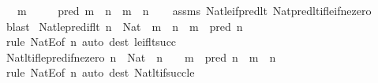 \begin{isabellebody}
\ \ \ {\isachardoublequoteopen}m\ {\isasymnoteq}\ {}{\isachardoublequoteclose}\isanewline
\ \ \ {\isachardoublequoteopen}pred\ m\ {\isacharless}{\kern0pt}\ n\ {\isasymlongleftrightarrow}\ m\ {\isasymle}\ n{\isachardoublequoteclose}\isanewline
%
\isadelimproof
\ \ %
\endisadelimproof
%
\isatagproof
{}\isamarkupfalse%
\ assms\ Nat{\isacharunderscore}{\kern0pt}le{\isacharunderscore}{\kern0pt}if{\isacharunderscore}{\kern0pt}pred{\isacharunderscore}{\kern0pt}lt\ Nat{\isacharunderscore}{\kern0pt}pred{\isacharunderscore}{\kern0pt}lt{\isacharunderscore}{\kern0pt}if{\isacharunderscore}{\kern0pt}le{\isacharunderscore}{\kern0pt}if{\isacharunderscore}{\kern0pt}ne{\isacharunderscore}{\kern0pt}zero\ \isamarkupfalse%
\ blast%
\endisatagproof
{\isafoldproof}%
%
\isadelimproof
\isanewline
%
\endisadelimproof
\isanewline
{}\isamarkupfalse%
\ Nat{\isacharunderscore}{\kern0pt}le{\isacharunderscore}{\kern0pt}pred{\isacharunderscore}{\kern0pt}if{\isacharunderscore}{\kern0pt}lt{\isacharcolon}{\kern0pt}\ {\isachardoublequoteopen}n\ {\isacharcolon}{\kern0pt}\ Nat\ {\isasymLongrightarrow}\ m\ {\isacharless}{\kern0pt}\ n\ {\isasymLongrightarrow}\ m\ {\isasymle}\ pred\ n{\isachardoublequoteclose}\isanewline
%
\isadelimproof
\ \ %
\endisadelimproof
%
\isatagproof
{}\isamarkupfalse%
\ {\isacharparenleft}{\kern0pt}rule\ NatE{\isacharbrackleft}{\kern0pt}of\ n{\isacharbrackright}{\kern0pt}{\isacharparenright}{\kern0pt}\ {\isacharparenleft}{\kern0pt}auto\ dest{\isacharcolon}{\kern0pt}\ le{\isacharunderscore}{\kern0pt}if{\isacharunderscore}{\kern0pt}lt{\isacharunderscore}{\kern0pt}succ{\isacharparenright}{\kern0pt}%
\endisatagproof
{\isafoldproof}%
%
\isadelimproof
\isanewline
%
\endisadelimproof
\isanewline
{}\isamarkupfalse%
\ Nat{\isacharunderscore}{\kern0pt}lt{\isacharunderscore}{\kern0pt}if{\isacharunderscore}{\kern0pt}le{\isacharunderscore}{\kern0pt}pred{\isacharunderscore}{\kern0pt}if{\isacharunderscore}{\kern0pt}ne{\isacharunderscore}{\kern0pt}zero{\isacharcolon}{\kern0pt}\ {\isachardoublequoteopen}n\ {\isacharcolon}{\kern0pt}\ Nat\ {\isasymLongrightarrow}\ n\ {\isasymnoteq}\ {}\ {\isasymLongrightarrow}\ m\ {\isasymle}\ pred\ n\ {\isasymLongrightarrow}\ m\ {\isacharless}{\kern0pt}\ n{\isachardoublequoteclose}\isanewline
%
\isadelimproof
\ \ %
\endisadelimproof
%
\isatagproof
{}\isamarkupfalse%
\ {\isacharparenleft}{\kern0pt}rule\ NatE{\isacharbrackleft}{\kern0pt}of\ n{\isacharbrackright}{\kern0pt}{\isacharparenright}{\kern0pt}\ {\isacharparenleft}{\kern0pt}auto\ dest{\isacharcolon}{\kern0pt}\ Nat{\isacharunderscore}{\kern0pt}lt{\isacharunderscore}{\kern0pt}if{\isacharunderscore}{\kern0pt}succ{\isacharunderscore}{\kern0pt}le{\isacharparenright}{\kern0pt}%

\end{isabellebody}
